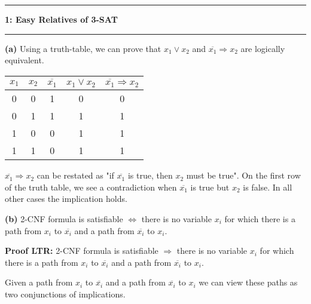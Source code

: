 \documentclass[11pt]{article}
\newcommand\question[2]{\vspace{.25in}\hrule\textbf{#1: #2}\vspace{.5em}\hrule\vspace{.10in}}
\renewcommand\part[1]{\vspace{.10in}\textbf{(#1)}}
\begin{document}
\raggedright
\newcommand\NAME{Jake Pitkin}  %
\newcommand\UID{u0891770}     %
\newcommand\HWNUM{3}              %

\question{1}{Easy Relatives of 3-SAT}

\part{a} Using a truth-table, we can prove that $x_1 \lor x_2$ and $\overline{x_1} \Rightarrow x_2$ are logically equivalent.

\begin{table}[H]
\centering
{\renewcommand{\arraystretch}{1.2}%
\begin{tabular}{| c | c | c | c | c |}
\hline
$x_1$ & $x_2$ & $\overline{x_1}$ & $x_1 \lor x_2$ & $\overline{x_1} \Rightarrow x_2$\\
\hline
0 & 0 & 1 & 0 & 0\\ \hline
0 & 1 & 1 & 1 & 1\\ \hline
1 & 0 & 0 & 1 & 1\\ \hline
1 & 1 & 0 & 1 & 1\\ \hline
\end{tabular}}
\end{table}

$\overline{x_1} \Rightarrow x_2$ can be restated as "if $\overline{x_1}$ is true, then $x_2$ must be true". On the first row of the truth table, we see a contradiction when $\overline{x_1}$ is true but $x_2$ is false. In all other cases the implication holds.

\part{b} 2-CNF formula is satisfiable $\iff$ there is no variable $x_i$ for which there is a path from $x_i$ to $\overline{x_i}$ and a path from $\overline{x_i}$ to $x_i$.

\textbf{Proof LTR:} 2-CNF formula is satisfiable $\Rightarrow$ there is no variable $x_i$ for which there is a path from $x_i$ to $\overline{x_i}$ and a path from $\overline{x_i}$ to $x_i$.

Given a path from $x_i$ to $\overline{x_i}$ and a path from $\overline{x_i}$ to $x_i$ we can view these paths as two conjunctions of implications. 
\end{document}
